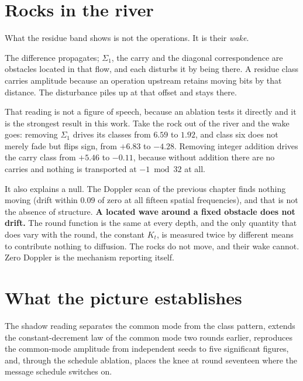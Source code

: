 \section{Rocks in the river}

What the residue band shows is not the operations. It is their \emph{wake}.

The difference propagates; \(\Sigma_1\), the carry and the diagonal correspondence are
obstacles located in that flow, and each disturbs it by being there. A residue class carries
amplitude because an operation upstream retains moving bits by that distance. The disturbance
piles up at that offset and stays there.

That reading is not a figure of speech, because an ablation tests it directly and it is the strongest
result in this work. Take the rock out of the river and the wake goes: removing \(\Sigma_1\) drives
its classes from \(6.59\) to \(1.92\), and class six does not merely fade but flips sign, from
\(+6.83\) to \(-4.28\). Removing integer addition drives the carry class from \(+5.46\) to
\(-0.11\), because without addition there are no carries and nothing is transported at
\(-1 \bmod 32\) at all.

It also explains a null. The Doppler scan of the previous chapter finds nothing moving (drift within
\(0.09\) of zero at all fifteen spatial frequencies), and that is not the absence of structure.
\textbf{A located wave around a fixed obstacle does not drift.} The round function is the same at
every depth, and the only quantity that does vary with the round, the constant \(K_t\), is measured
twice by different means to contribute nothing to diffusion. The rocks do not move, and their wake
cannot. Zero Doppler is the mechanism reporting itself.

\section{What the picture establishes}

The shadow reading separates the common mode from the class pattern, extends the constant-decrement
law of the common mode two rounds earlier, reproduces the common-mode amplitude from independent
seeds to five significant figures, and, through the schedule ablation, places the knee at round
seventeen where the message schedule switches on.
